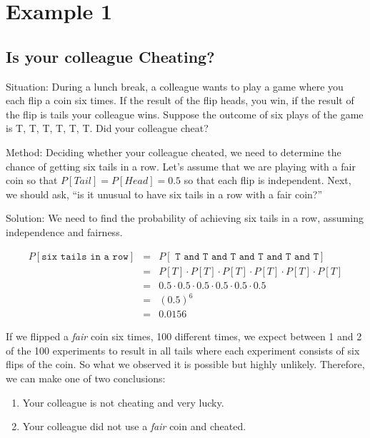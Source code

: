 \documentclass[11pt]{book}\usepackage[]{graphicx}\usepackage[]{color}
\begin{document}
\section{Example 1}

\subsection{Is your colleague Cheating?}

Situation: During a lunch break, a colleague wants to play a game where you each flip a coin six times.  If the result of the flip heads, you win, if the result of the flip is tails your colleague wins.  Suppose the outcome of six plays of the game is T, T, T, T, T, T.  Did your colleague cheat?

Method: Deciding whether your colleague cheated, we need to determine the chance of getting six tails in a row. Let's assume that we are playing with a fair coin so that $P[Tail] = P[Head] = 0.5$ so that each flip is independent.  Next, we should ask, ``is it unusual to have six tails in a row with a fair coin?''


Solution: We need to find the probability of achieving six tails in a row, assuming independence and fairness.

\newpage


\begin{eqnarray*}
P[\texttt{six tails in a row}] &=& P[\texttt{ T and T and T and T and T and T} ] \\
&=& P[T] \cdot P[T] \cdot P[T] \cdot P[T] \cdot P[T] \cdot P[T] \\
&=& 0.5 \cdot 0.5 \cdot 0.5 \cdot 0.5 \cdot 0.5 \cdot 0.5 \\
&=& (0.5)^6 \\
&=& 0.0156
\end{eqnarray*}


If we flipped a \textit{fair} coin six times, 100 different times, we expect between 1 and 2 of the 100 experiments to result in all tails where each experiment consists of six flips of the coin.  So what we observed it is possible but highly unlikely.  Therefore, we can make one of two conclusions:

\begin{enumerate}
\item Your colleague is not cheating and very lucky.
\item Your colleague did not use a \textit{fair} coin and cheated.
\end{enumerate}
\end{document}
